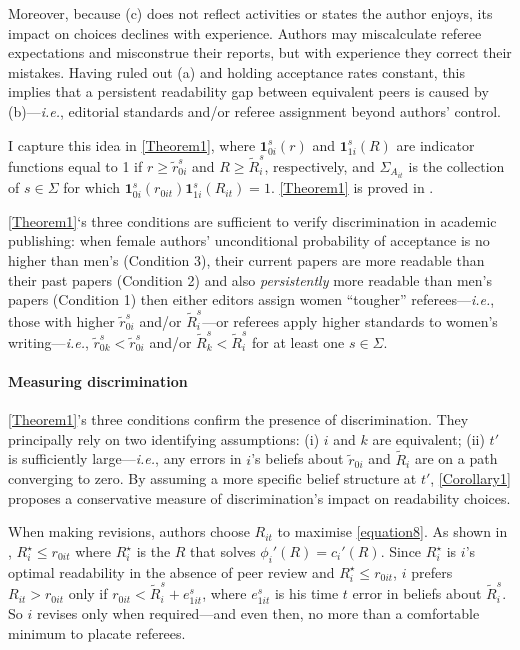 Moreover, because (c) does not reflect activities or states the author enjoys, its impact on choices declines with experience. Authors may miscalculate referee expectations and misconstrue their reports, but with experience they correct their mistakes. Having ruled out (a) and holding acceptance rates constant, this implies that a persistent readability gap between equivalent peers is caused by (b)---\emph{i.e.}, editorial standards and\slash or referee assignment beyond authors' control.

I capture this idea in \autoref{Theorem1}, where $\bm1_{0i}^s(r)$ and $\bm1_{1i}^s(R)$ are indicator functions equal to 1 if $r\ge\widetilde r_{0i}^s$ and $R\ge\widetilde R_i^s$, respectively, and $\Sigma_{A_{it}}$ is the collection of $s\in\Sigma$ for which $\bm1_{0i}^s(r_{0it})\bm1_{1i}^s(R_{it})=1$. \autoref{Theorem1} is proved in .



\autoref{Theorem1}`s three conditions are sufficient to verify discrimination in academic publishing: when female authors' unconditional probability of acceptance is no higher than men's (Condition 3), their current papers are more readable than their past papers (Condition 2) and also \emph{persistently} more readable than men's papers (Condition 1) then either editors assign women ``tougher'' referees---\emph{i.e.}, those with higher $\widetilde r_{0i}^s$ and\slash or $\widetilde R_i^s$---or referees apply higher standards to women's writing---\emph{i.e.}, $\widetilde r_{0k}^s<\widetilde r_{0i}^s$ and\slash or $\widetilde R_k^s<\widetilde R_i^s$ for at least one $s\in\Sigma$.

\paragraph{Measuring discrimination}
\label{matchingidentificaiton}

\autoref{Theorem1}'s three conditions confirm the presence of discrimination. They principally rely on two identifying assumptions: (i) $i$ and $k$ are equivalent; (ii) $t'$ is sufficiently large---\emph{i.e.}, any errors in $i$'s beliefs about $\widetilde r_{0i}$ and $\widetilde R_i$ are on a path converging to zero. By assuming a more specific belief structure at $t'$, \autoref{Corollary1} proposes a conservative measure of discrimination's impact on readability choices.

When making revisions, authors choose $R_{it}$ to maximise \autoref{equation8}. As shown in , $R_i^\star\le r_{0it}$ where $R_i^\star$ is the $R$ that solves $\phi_i'(R)=c_i'(R)$. Since $R_i^\star$ is $i$'s optimal readability in the absence of peer review and $R_i^\star\le r_{0it}$, $i$ prefers $R_{it}>r_{0it}$ only if $r_{0it}<\widetilde R_i^s + e_{1it}^s$, where $e_{1it}^s$ is his time $t$ error in beliefs about $\widetilde R_i^s$. So $i$ revises only when required---and even then, no more than a comfortable minimum to placate referees.

